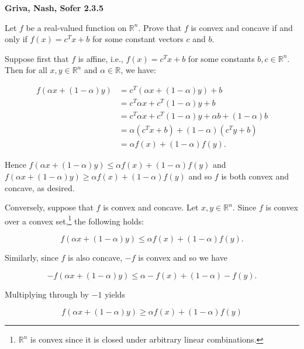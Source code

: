 \textbf{Griva, Nash, Sofer 2.3.5}

Let $f$ be a real-valued function on $\mathbb{R}^n$. Prove that $f$ is convex and concave if and only if 
$f(x) = c^T x + b$ for some constant vectors $c$ and $b$.

\begin{solution}

  Suppose first that $f$ is affine, i.e., $f(x) = c^T x + b$ for some constants $b, c \in \mathbb{R}^n$.
  Then for all $x, y \in \mathbb{R}^n$ and $\alpha \in \mathbb{R}$, we have:
  
  \begin{align*}
    f(\alpha x + (1 - \alpha)y) &= c^T \left( \alpha x + (1 - \alpha)y \right) + b  \\
                                &= c^T \alpha x + c^T (1 - \alpha)y + b \\
                                &= c^T \alpha x + c^T (1 - \alpha)y + \alpha b + (1 - \alpha) b \\
                                &= \alpha (c^T x + b) + (1 - \alpha)(c^T y + b) \\
                                &= \alpha f(x) + (1 - \alpha)f(y).
  \end{align*}

  Hence $f(\alpha x + (1 - \alpha)y) \le \alpha f(x) + (1 - \alpha)f(y)$ and 
  $f(\alpha x + (1 - \alpha)y) \ge \alpha f(x) + (1 - \alpha)f(y)$ and so $f$ is both convex and concave, as desired.

  \vspace{3em}

  Conversely, suppose that $f$ is convex and concave. Let $x, y \in \mathbb{R}^n$. 
  Since $f$ is convex over a convex set,\footnote{
    $\mathbb{R}^n$ is convex since it is closed under arbitrary linear combinations.
  } the following holds:

  \begin{equation} \label{eq:1}
    f(\alpha x + (1 - \alpha)y) \le \alpha f(x) + (1 - \alpha) f(y).
  \end{equation}

  Similarly, since $f$ is also concave, $-f$ is convex and so we have

  $$
    -f(\alpha x + (1 - \alpha)y) \le \alpha -f(x) + (1 - \alpha) -f(y).
  $$

  Multiplying through by $-1$ yields

  $$
    f(\alpha x + (1 - \alpha)y) \ge \alpha f(x) + (1 - \alpha) f(y)
  $$


\end{solution}
